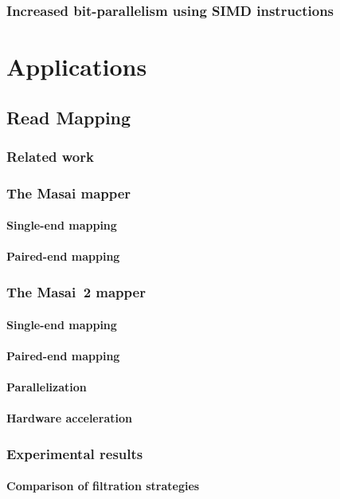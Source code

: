 \section{Increased bit-parallelism using SIMD instructions}


\part{Applications}

\chapter{Read Mapping}
\section{Related work}
\section{The Masai mapper}
\subsection{Single-end mapping}
\subsection{Paired-end mapping}
\section{The Masai~2 mapper}
\subsection{Single-end mapping}
\subsection{Paired-end mapping}
\subsection{Parallelization}
\subsection{Hardware acceleration}
\section{Experimental results}
\subsection{Comparison of filtration strategies}

